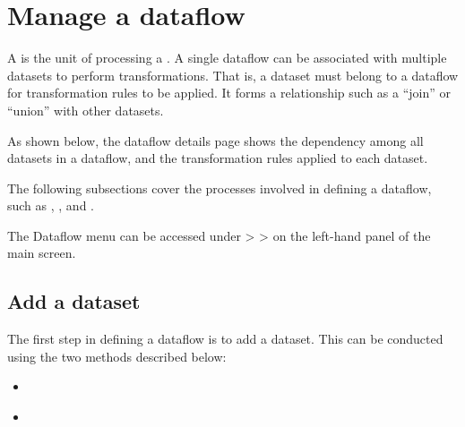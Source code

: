 \documentclass[letterpaper,10pt,english]{sphinxmanual}
\begin{document}
\section{Manage a dataflow}
\label{\detokenize{discovery/part07/manage_dataflow:id1}}\label{\detokenize{discovery/part07/manage_dataflow::doc}}
A  is the unit of processing a . A single dataflow can be associated with multiple datasets to perform transformations. That is, a dataset must belong to a dataflow for transformation rules to be applied. It forms a relationship such as a “join” or “union” with other datasets.

As shown below, the dataflow details page shows the dependency among all datasets in a dataflow, and the transformation rules applied to each dataset.
\begin{quote}

\begin{figure}[H]
\centering

\noindent{}
\end{figure}
\end{quote}

The following subsections cover the processes involved in defining a dataflow, such as , , and .

The Dataflow menu can be accessed under  \textgreater{}  \textgreater{}  on the left-hand panel of the main screen.
\begin{quote}

\begin{figure}[H]
\centering

\noindent{}
\end{figure}
\end{quote}


\subsection{Add a dataset}
\label{\detokenize{discovery/part07/add_datasets:id1}}\label{\detokenize{discovery/part07/add_datasets::doc}}
The first step in defining a dataflow is to add a dataset. This can be conducted using the two methods described below:
\begin{itemize}
\item {} 
{\hyperref[\detokenize{discovery/part07/add_datasets:dataflow-creation-first}]{}}

\item {} 
{\hyperref[\detokenize{discovery/part07/add_datasets:dataflow-from-dataset}]{}}

\end{itemize}
\end{document}
